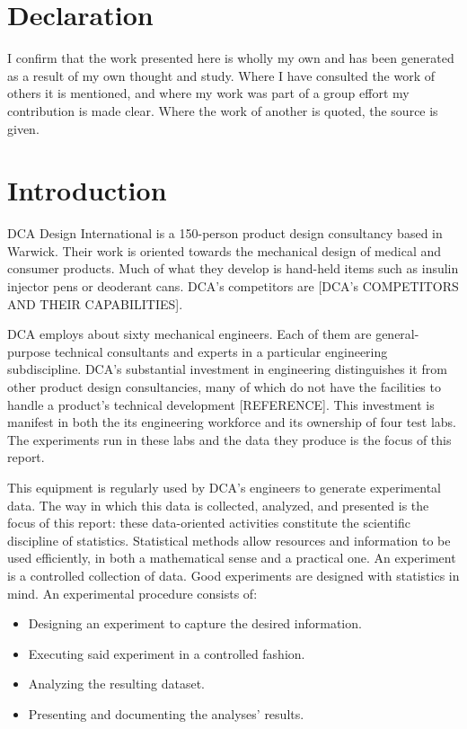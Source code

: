 \documentclass[11pt,a4paper,article]{memoir} %
\begin{document}
\chapter*{\large Declaration}
\vspace*{-\baselineskip}
I confirm that the work presented here is wholly my own and has been generated as a result of my own thought and study. Where I have consulted the work of others it is mentioned, and where my work was part of a group effort my contribution is made clear. Where the work of another is quoted, the source is given.



\newpage
\chapter{Introduction}
DCA Design International is a 150-person product design consultancy based in Warwick. Their work is oriented towards the mechanical design of medical and consumer products. Much of what they develop is hand-held items such as insulin injector pens or deoderant cans. DCA's competitors are [DCA's COMPETITORS AND THEIR CAPABILITIES].
\par
DCA employs about sixty mechanical engineers. Each of them are general-purpose technical consultants and experts in a particular engineering subdiscipline. DCA's substantial investment in engineering distinguishes it from other product design consultancies, many of which do not have the facilities to handle a product's technical development [REFERENCE]. This investment is manifest in both the its engineering workforce and its ownership of four test labs. The experiments run in these labs and the data they produce is the focus of this report. 
\par
This equipment is regularly used by DCA's engineers to generate experimental data. The way in which this data is collected, analyzed, and presented is the focus of this report: these data-oriented activities constitute the scientific discipline of statistics. Statistical methods allow resources and information to be used efficiently, in both a mathematical sense and a practical one. An experiment is a controlled collection of data. Good experiments are designed with statistics in mind. An experimental procedure consists of:
\begin{itemize}
\item Designing an experiment to capture the desired information.
\item Executing said experiment in a controlled fashion.
\item Analyzing the resulting dataset.
\item Presenting and documenting the analyses' results.
\end{itemize}
\end{document}
